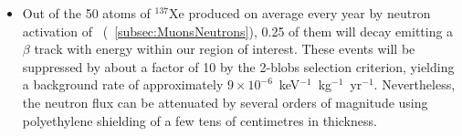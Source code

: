 \begin{itemize}
%
\item Out of the 50 atoms of $^{137}$Xe produced on average every year by neutron activation of \Xe\ (\textsection~\ref{subsec:MuonsNeutrons}), 0.25 of them will decay emitting a $\beta$ track with energy within our region of interest. These events will be suppressed by about a factor of 10 by the 2-blobs selection criterion, yielding a background rate of approximately $9\times10^{-6}$~keV$^{-1}$~kg$^{-1}$~yr$^{-1}$. Nevertheless, the neutron flux can be attenuated by several orders of magnitude using polyethylene shielding of a few tens of centimetres in thickness.
\end{itemize}







